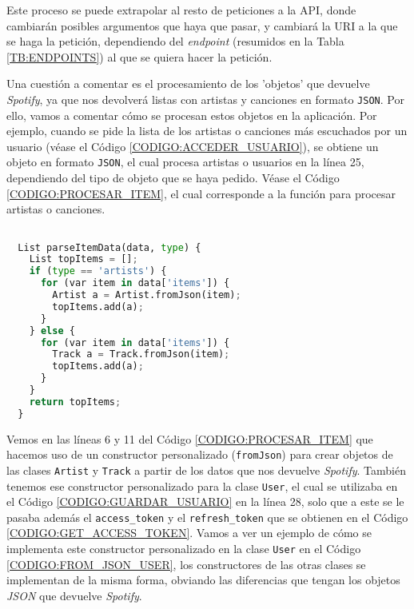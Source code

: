 Este proceso se puede extrapolar al resto de peticiones a la API, donde cambiarán posibles argumentos que haya que pasar, y cambiará la URI a la que se haga la petición,
dependiendo del \textit{endpoint} (resumidos en la Tabla \ref{TB:ENDPOINTS}) al que se quiera hacer la petición.

Una cuestión a comentar es el procesamiento de los 'objetos' que devuelve \textit{Spotify}, ya que nos devolverá listas con 
artistas y canciones en formato \texttt{JSON}. Por ello, vamos a comentar cómo se procesan estos objetos en la aplicación. Por ejemplo, cuando 
se pide la lista de los artistas o canciones más escuchados por un usuario (véase el Código \ref{CODIGO:ACCEDER_USUARIO}), se obtiene un objeto en formato \texttt{JSON}, el cual procesa 
artistas o usuarios en la línea 25, dependiendo del tipo de objeto que se haya pedido. Véase el Código \ref{CODIGO:PROCESAR_ITEM}, el cual corresponde
a la función para procesar artistas o canciones.

\begin{lstlisting}[language=python, caption=Procesar objeto en formato \textit{JSON}, label=CODIGO:PROCESAR_ITEM]

  List parseItemData(data, type) {
    List topItems = [];
    if (type == 'artists') {
      for (var item in data['items']) {
        Artist a = Artist.fromJson(item);
        topItems.add(a);
      }
    } else {
      for (var item in data['items']) {
        Track a = Track.fromJson(item);
        topItems.add(a);
      }
    }
    return topItems;
  }

\end{lstlisting}

Vemos en las líneas 6 y 11 del Código \ref{CODIGO:PROCESAR_ITEM} que hacemos uso de un constructor personalizado (\texttt{fromJson}) 
para crear objetos de las clases \texttt{Artist} y \texttt{Track} a partir de los datos que nos devuelve \textit{Spotify}. También tenemos 
ese constructor personalizado para la clase \texttt{User}, el cual se utilizaba en el Código \ref{CODIGO:GUARDAR_USUARIO} en la línea 28, solo
que a este se le pasaba además el \texttt{access\_token} y el \texttt{refresh\_token} que se obtienen en el Código \ref{CODIGO:GET_ACCESS_TOKEN}.
Vamos a ver un ejemplo de cómo se implementa este constructor personalizado en la clase \texttt{User} en el Código \ref{CODIGO:FROM_JSON_USER}, los 
constructores de las otras clases se implementan de la misma forma, obviando las diferencias que tengan los objetos \textit{JSON} que devuelve \textit{Spotify}.

